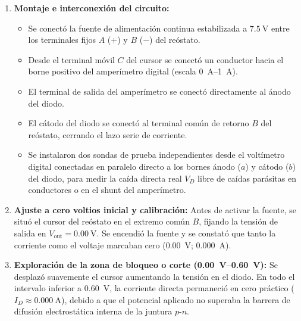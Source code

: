 \begin{appendices}
\begin{enumerate}
    \item \textbf{Montaje e interconexión del circuito:}
    \begin{itemize}
        \item Se conectó la fuente de alimentación continua estabilizada a $\qty{7,5}{\volt}$ entre los terminales fijos $A$ ($+$) y $B$ ($-$) del reóstato.
        \item Desde el terminal móvil $C$ del cursor se conectó un conductor hacia el borne positivo del amperímetro digital (escala \qtyrange{0}{1}{\ampere}).
        \item El terminal de salida del amperímetro se conectó directamente al ánodo del diodo.
        \item El cátodo del diodo se conectó al terminal común de retorno $B$ del reóstato, cerrando el lazo serie de corriente.
        \item Se instalaron dos sondas de prueba independientes desde el voltímetro digital conectadas en paralelo directo a los bornes ánodo ($a$) y cátodo ($b$) del diodo, para medir la caída directa real $V_D$ libre de caídas parásitas en conductores o en el shunt del amperímetro.
    \end{itemize}
    
    \item \textbf{Ajuste a cero voltios inicial y calibración:} Antes de activar la fuente, se situó el cursor del reóstato en el extremo común $B$, fijando la tensión de salida en $V_{\text{out}} = \qty{0,00}{\volt}$. Se encendió la fuente y se constató que tanto la corriente como el voltaje marcaban cero (\qty{0,00}{\volt}; \qty{0,000}{\ampere}).
    
    \item \textbf{Exploración de la zona de bloqueo o corte (\qtyrange{0,00}{0,60}{\volt}):} Se desplazó suavemente el cursor aumentando la tensión en el diodo. En todo el intervalo inferior a \qty{0,60}{\volt}, la corriente directa permaneció en cero práctico ($I_D \approx \qty{0,000}{\ampere}$), debido a que el potencial aplicado no superaba la barrera de difusión electrostática interna de la juntura $p$-$n$.
    

\end{enumerate}
\end{appendices}
